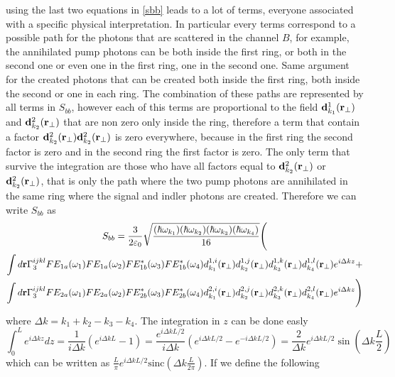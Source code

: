 using the last two equations in \eqref{sbb} leads to a lot of terms, everyone associated with a specific physical interpretation. In particular every terms correspond to a possible path for the photons that are scattered in the channel $B$, for example, the annihilated pump photons can be both inside the first ring, or both in the second one or even one in the first ring, one in the second one. Same argument for the created photons that can be created both inside the first ring, both inside the second or one in each ring. The combination of these paths are represented by all terms in $S_{bb}$, however each of this terms are proportional to the field $\mathbf{d}^1_{k_1}(\mathbf{r}_{\perp})$ and $\mathbf{d}^2_{k_2}(\mathbf{r}_{\perp})$ that are non zero only inside the ring, therefore a term that contain a factor $\mathbf{d}^2_{k_2}(\mathbf{r}_{\perp})\mathbf{d}^2_{k_2}(\mathbf{r}_{\perp})$ is zero everywhere, because in the first ring the second factor is zero and in the second ring the first factor is zero. The only term that survive the integration are those who have all factors equal to  $\mathbf{d}^2_{k_2}(\mathbf{r}_{\perp})$ or $\mathbf{d}^2_{k_2}(\mathbf{r}_{\perp})$, that is only the path where the two pump photons are annihilated in the same ring where the signal and indler photons are created. Therefore we can write $S_{bb}$ as
\begin{multline}S_{bb} =\frac{3}{2\varepsilon_0}\sqrt{\frac{(\hbar\omega_{k_1})(\hbar\omega_{k_2})(\hbar\omega_{k_3})(\hbar\omega_{k_4})}{16}}\Bigg( \\ \int d\mathbf{r} \Gamma^{ijkl}_3FE_{1a}(\omega_1)FE_{1a}(\omega_2)FE^*_{1b}(\omega_3)FE^*_{1b}(\omega_4)d^{1,i}_{k_1}(\mathbf{r}_{\perp})d^{1,j}_{k_2}(\mathbf{r}_{\perp})d^{1,k}_{k_3}(\mathbf{r}_{\perp})d^{1,l}_{k_4}(\mathbf{r}_{\perp})e^{i\Delta k z} +\\
\int d\mathbf{r} \Gamma^{ijkl}_3FE_{2a}(\omega_1)FE_{2a}(\omega_2)FE^*_{2b}(\omega_3)FE^*_{2b}(\omega_4)d^{2,i}_{k_1}(\mathbf{r}_{\perp})d^{2,j}_{k_2}(\mathbf{r}_{\perp})d^{2,k}_{k_3}(\mathbf{r}_{\perp})d^{2,l}_{k_4}(\mathbf{r}_{\perp})e^{i\Delta k z}\Bigg)\end{multline}
where $\Delta k = k_1 + k_2 -k_3 - k_4$. The integration in $z$ can be done easly
\begin{equation}\int_0^{L} e^{i\Delta k z} dz = \frac{1}{i\Delta k}(e^{i\Delta k L} - 1) = \frac{e^{i\Delta k L/2}}{i\Delta k}(e^{i\Delta k L/2}- e^{-i\Delta k L/2}) = \frac{2}{\Delta k}e^{i\Delta k L/2} \sin\left(\Delta k \frac{L}{2}\right)\end{equation}
which can be written as $\frac{L}{\pi}e^{i\Delta k L/2} \text{sinc}\left(\Delta k \frac{L}{2\pi}\right)$. If we define the following
